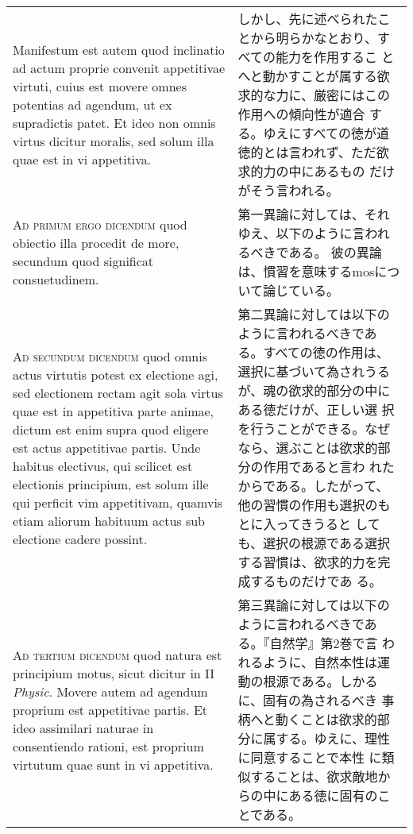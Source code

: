 \documentclass[10pt]{jsarticle}
\begin{document}
\begin{longtable}{p{21em}p{21em}}
\\

Manifestum est autem quod inclinatio ad actum proprie
convenit appetitivae virtuti, cuius est movere omnes potentias ad
agendum, ut ex supradictis patet. Et ideo non omnis virtus dicitur
moralis, sed solum illa quae est in vi appetitiva.

&

しかし、先に述べられたことから明らかなとおり、すべての能力を作用するこ
とへと動かすことが属する欲求的な力に、厳密にはこの作用への傾向性が適合
する。ゆえにすべての徳が道徳的とは言われず、ただ欲求的力の中にあるもの
だけがそう言われる。

\\



{\scshape Ad primum ergo dicendum} quod obiectio illa procedit de
more, secundum quod significat consuetudinem.

&

第一異論に対しては、それゆえ、以下のように言われるべきである。
彼の異論は、慣習を意味するmosについて論じている。

\\



{\scshape Ad secundum dicendum} quod omnis actus virtutis potest ex
electione agi, sed electionem rectam agit sola virtus quae est in
appetitiva parte animae, dictum est enim supra quod eligere est actus
appetitivae partis. Unde habitus electivus, qui scilicet est
electionis principium, est solum ille qui perficit vim appetitivam,
quamvis etiam aliorum habituum actus sub electione cadere possint.

&

第二異論に対しては以下のように言われるべきである。すべての徳の作用は、
選択に基づいて為されうるが、魂の欲求的部分の中にある徳だけが、正しい選
択を行うことができる。なぜなら、選ぶことは欲求的部分の作用であると言わ
れたからである。したがって、他の習慣の作用も選択のもとに入ってきうると
しても、選択の根源である選択する習慣は、欲求的力を完成するものだけであ
る。

\\


{\scshape Ad tertium dicendum} quod natura est principium motus, sicut
dicitur in II {\itshape Physic}. Movere autem ad agendum proprium est
appetitivae partis. Et ideo assimilari naturae in consentiendo
rationi, est proprium virtutum quae sunt in vi appetitiva.

&

第三異論に対しては以下のように言われるべきである。『自然学』第2巻で言
われるように、自然本性は運動の根源である。しかるに、固有の為されるべき
事柄へと動くことは欲求的部分に属する。ゆえに、理性に同意することで本性
に類似することは、欲求敵地からの中にある徳に固有のことである。

\end{longtable}
\newpage
\end{document}
